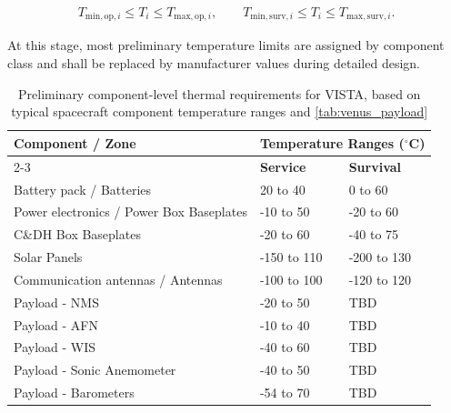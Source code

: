 \begin{align}
    T_{\mathrm{min,op},i} \leq T_i \leq T_{\mathrm{max,op},i},
    \qquad
    T_{\mathrm{min,surv},i} \leq T_i \leq T_{\mathrm{max,surv},i}.
    \label{eq:component_temperature_requirements}
\end{align}

At this stage, most preliminary temperature limits are assigned by component class and shall be replaced by manufacturer values during detailed design.

\begin{table}[H]
\centering
\small
\caption{Preliminary component-level thermal requirements for VISTA, based on typical spacecraft component temperature ranges \cite{wertz1999smad} and \autoref{tab:venus_payload}}
\label{tab:thermal_requirements}
\renewcommand{\arraystretch}{1}
\begin{tabular}{|p{6.8cm}|p{2.3cm}|p{2.3cm}|}
\hline
\textbf{Component / Zone} & \multicolumn{2}{c|}{\textbf{Temperature Ranges ($^\circ$C)}}  \\
\cline{2-3}
 & \textbf{Service} & \textbf{Survival}  \\
\hline

Battery pack / Batteries & 20 to 40 & 0 to 60 \\
\hline

Power electronics / Power Box Baseplates & -10 to 50 & -20 to 60  \\
\hline


C\&DH Box Baseplates & -20 to 60 & -40 to 75  \\
\hline


Solar Panels & -150 to 110 & -200 to 130  \\
\hline


Communication antennas / Antennas & -100 to 100 & -120 to 120  \\
\hline


Payload - NMS & -20 to 50 & TBD \\
\hline

Payload - AFN & -10 to 40 & TBD \\
\hline


Payload - WIS  & -40 to 60 & TBD \\
\hline


Payload - Sonic Anemometer & -40 to 50 & TBD \\
\hline


Payload - Barometers & -54 to 70 & TBD \\
\hline




\end{tabular}
\end{table}
